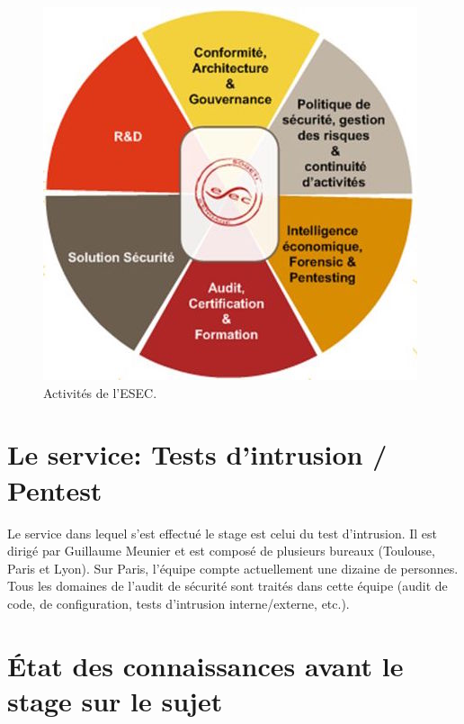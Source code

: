 \begin{figure}[h]
    \centering
    \includegraphics[scale=0.5]{images/activities.jpg}
    \caption{Activités de l'ESEC.}
\end{figure}

\section*{Le service: Tests d'intrusion / Pentest}
Le service dans lequel s'est effectué le stage est celui du test d'intrusion. Il est dirigé par Guillaume Meunier et est composé
de plusieurs bureaux (Toulouse, Paris et Lyon). Sur Paris, l'équipe compte actuellement une dizaine de personnes. Tous les domaines de l'audit de
sécurité sont traités dans cette équipe (audit de code, de configuration, tests d'intrusion interne/externe, etc.).

\subparagraph{}

\section*{État des connaissances avant le stage sur le sujet}
